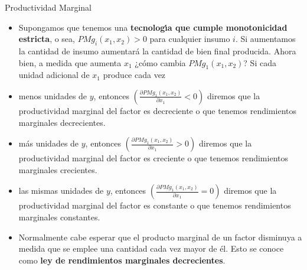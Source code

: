 \documentclass{beamer}
\theoremstyle{definition}
\begin{document}
\begin{frame}{Productividad Marginal}
\begin{itemize}
\item Supongamos que tenemos una \textbf{tecnolog\'{\i}a que cumple monotonicidad estricta}, o sea, $PMg_i(x_1,x_2)>0$ para cualquier insumo $i$. Si aumentamos la cantidad de insumo aumentará la cantidad de bien final producida. Ahora bien, a medida que aumenta $x_1$ ¿cómo cambia $PMg_1(x_1,x_2)$? Si cada unidad adicional de $x_1$ produce cada vez %
\small
\item menos unidades de $y$, entonces $(\frac{\partial PMg_{1}(x_1,x_2)}{\partial x_{1}}<0)$ diremos que la productividad marginal del factor es decreciente o que tenemos rendimientos marginales decrecientes. 
\item más unidades de $y$, entonces  $(\frac{\partial PMg_{1}(x_1,x_2)}{\partial x_{1}}>0)$ diremos que la productividad marginal del factor es creciente o que tenemos rendimientos marginales crecientes.
\item las mismas unidades de $y$, entonces  $(\frac{\partial PMg_{1}(x_1,x_2)}{\partial x_{1}}=0)$ diremos que la productividad marginal del factor es constante o que tenemos rendimientos marginales constantes.
\item Normalmente cabe esperar que el producto marginal de un factor disminuya a medida que se emplee una cantidad cada vez mayor de él. Esto se conoce como \textbf{ley de rendimientos marginales decrecientes}.

\end{itemize}
\end{frame}	
\end{document}

